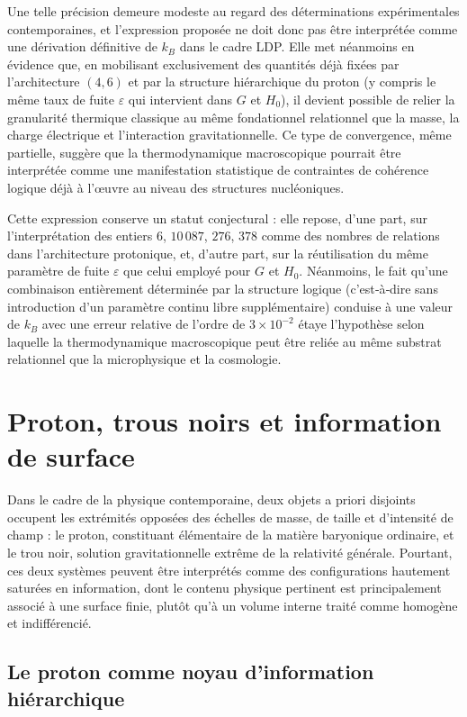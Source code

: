 \documentclass[11pt,a4paper]{article}
\begin{document}
Une telle précision demeure modeste au regard des déterminations expérimentales contemporaines, et l’expression proposée ne doit donc pas être interprétée comme une dérivation définitive de \(k_B\) dans le cadre LDP. Elle met néanmoins en évidence que, en mobilisant exclusivement des quantités déjà fixées par l’architecture \((4,6)\) et par la structure hiérarchique du proton (y compris le même taux de fuite \(\varepsilon\) qui intervient dans \(G\) et \(H_0\)), il devient possible de relier la granularité thermique classique au même fondationnel relationnel que la masse, la charge électrique et l’interaction gravitationnelle. Ce type de convergence, même partielle, suggère que la thermodynamique macroscopique pourrait être interprétée comme une manifestation statistique de contraintes de cohérence logique déjà à l’œuvre au niveau des structures nucléoniques.

Cette expression conserve un statut conjectural : elle repose, d’une part, sur l’interprétation des entiers \(6\), \(10\,087\), \(276\), \(378\) comme des nombres de relations dans l’architecture protonique, et, d’autre part, sur la réutilisation du même paramètre de fuite \(\varepsilon\) que celui employé pour \(G\) et \(H_0\). Néanmoins, le fait qu’une combinaison entièrement déterminée par la structure logique (c’est‑à‑dire sans introduction d’un paramètre continu libre supplémentaire) conduise à une valeur de \(k_B\) avec une erreur relative de l’ordre de \(3\times 10^{-2}\) étaye l’hypothèse selon laquelle la thermodynamique macroscopique peut être reliée au même substrat relationnel que la microphysique et la cosmologie.

\section{Proton, trous noirs et information de surface}

Dans le cadre de la physique contemporaine, deux objets a priori disjoints occupent les extrémités opposées des échelles de masse, de taille et d’intensité de champ : le proton, constituant élémentaire de la matière baryonique ordinaire, et le trou noir, solution gravitationnelle extrême de la relativité générale. Pourtant, ces deux systèmes peuvent être interprétés comme des configurations hautement saturées en information, dont le contenu physique pertinent est principalement associé à une surface finie, plutôt qu’à un volume interne traité comme homogène et indifférencié.

\subsection{Le proton comme noyau d’information hiérarchique}
\end{document}
